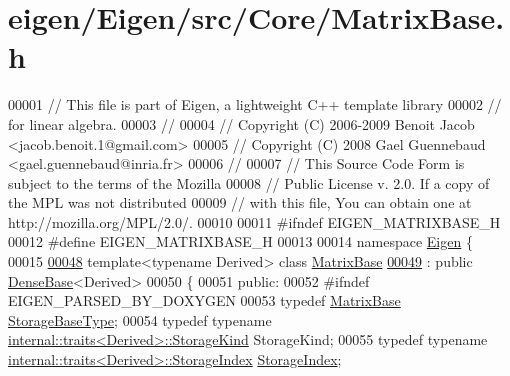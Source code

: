 \hypertarget{eigen_2_eigen_2src_2_core_2_matrix_base_8h_source}{}\section{eigen/\+Eigen/src/\+Core/\+Matrix\+Base.h}
\label{eigen_2_eigen_2src_2_core_2_matrix_base_8h_source}

\begin{DoxyCode}
00001 \textcolor{comment}{// This file is part of Eigen, a lightweight C++ template library}
00002 \textcolor{comment}{// for linear algebra.}
00003 \textcolor{comment}{//}
00004 \textcolor{comment}{// Copyright (C) 2006-2009 Benoit Jacob <jacob.benoit.1@gmail.com>}
00005 \textcolor{comment}{// Copyright (C) 2008 Gael Guennebaud <gael.guennebaud@inria.fr>}
00006 \textcolor{comment}{//}
00007 \textcolor{comment}{// This Source Code Form is subject to the terms of the Mozilla}
00008 \textcolor{comment}{// Public License v. 2.0. If a copy of the MPL was not distributed}
00009 \textcolor{comment}{// with this file, You can obtain one at http://mozilla.org/MPL/2.0/.}
00010 
00011 \textcolor{preprocessor}{#ifndef EIGEN\_MATRIXBASE\_H}
00012 \textcolor{preprocessor}{#define EIGEN\_MATRIXBASE\_H}
00013 
00014 \textcolor{keyword}{namespace }\hyperlink{namespace_eigen}{Eigen} \{
00015 
\hyperlink{group___core___module}{00048} \textcolor{keyword}{template}<\textcolor{keyword}{typename} Derived> \textcolor{keyword}{class }\hyperlink{group___core___module_class_eigen_1_1_matrix_base}{MatrixBase}
\hyperlink{struct_eigen_1_1_matrix_base_1_1_cast_xpr}{00049}   : \textcolor{keyword}{public} \hyperlink{group___core___module_class_eigen_1_1_dense_base}{DenseBase}<Derived>
00050 \{
00051   \textcolor{keyword}{public}:
00052 \textcolor{preprocessor}{#ifndef EIGEN\_PARSED\_BY\_DOXYGEN}
00053     \textcolor{keyword}{typedef} \hyperlink{group___core___module_class_eigen_1_1_matrix_base}{MatrixBase} \hyperlink{group___core___module_class_eigen_1_1_matrix_base}{StorageBaseType};
00054     \textcolor{keyword}{typedef} \textcolor{keyword}{typename} \hyperlink{struct_eigen_1_1internal_1_1traits}{internal::traits<Derived>::StorageKind} 
      StorageKind;
00055     \textcolor{keyword}{typedef} \textcolor{keyword}{typename} \hyperlink{struct_eigen_1_1internal_1_1traits}{internal::traits<Derived>::StorageIndex} 
      \hyperlink{group___core___module_a2d1aba3f6c414715d830f760913c7e00}{StorageIndex};

\end{DoxyCode}
